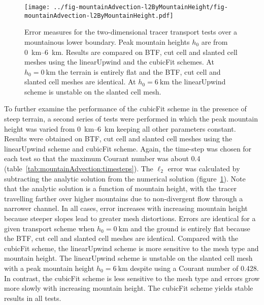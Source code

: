 \begin{figure}
	\centering
	\texttt{[image: ../fig-mountainAdvection-l2ByMountainHeight/fig-mountainAdvection-l2ByMountainHeight.pdf]}
%
	\caption{Error measures for the two-dimensional tracer transport tests over a mountainous lower boundary.  Peak mountain heights $h_0$ are from \SIrange{0}{6}{\kilo\meter}.  Results are compared on BTF, cut cell and slanted cell meshes using the linearUpwind and the cubicFit schemes.  At $h_0 = \SI{0}{\kilo\meter}$ the terrain is entirely flat and the BTF, cut cell and slanted cell meshes are identical.  At $h_0 = \SI{6}{\kilo\meter}$ the linearUpwind scheme is unstable on the slanted cell mesh.}
	\label{fig:mountainAdvection-l2ByMountainHeight}
\end{figure}

To further examine the performance of the cubicFit scheme in the presence of steep terrain, a second series of tests were performed in which the peak mountain height was varied from \SIrange{0}{6}{\kilo\meter} keeping all other parameters constant.
Results were obtained on BTF, cut cell and slanted cell meshes using the linearUpwind scheme and cubicFit scheme.  Again, the time-step was chosen for each test so that the maximum Courant number was about \num{0.4} (table~\ref{tab:mountainAdvection:timesteps}).  The $\ell_2$ error was calculated by subtracting the analytic solution from the numerical solution (figure~\ref{fig:mountainAdvection-l2ByMountainHeight}).
Note that the analytic solution is a function of mountain height, with the tracer travelling farther over higher mountains due to non-divergent flow through a narrower channel.
In all cases, error increases with increasing mountain height because steeper slopes lead to greater mesh distortions.
Errors are identical for a given transport scheme when $h_0 = \SI{0}{\kilo\meter}$ and the ground is entirely flat because the BTF, cut cell and slanted cell meshes are identical.
Compared with the cubicFit scheme, the linearUpwind scheme is more sensitive to the mesh type and mountain height.  The linearUpwind scheme is unstable on the slanted cell mesh with a peak mountain height $h_0 = \SI{6}{\kilo\meter}$ despite using a Courant number of \num{0.428}.
In contrast, the cubicFit scheme is less sensitive to the mesh type and errors grow more slowly with increasing mountain height.  The cubicFit scheme yields stable results in all tests.

